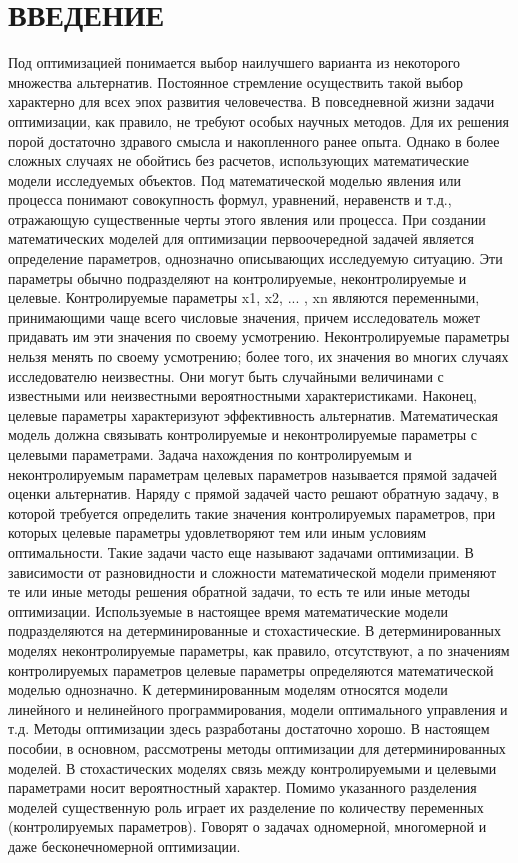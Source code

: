 \newpage

\section*{ВВЕДЕНИЕ}
Под оптимизацией понимается выбор наилучшего варианта из некоторого множества альтернатив. Постоянное стремление осуществить такой выбор характерно для всех эпох развития человечества. В повседневной жизни задачи оптимизации, как правило, не требуют особых научных методов. Для их решения порой достаточно здравого смысла и накопленного ранее опыта. Однако в более сложных случаях не обойтись без расчетов, использующих математические модели исследуемых объектов. Под математической моделью явления или процесса понимают совокупность формул, уравнений, неравенств и т.д., отражающую существенные черты этого явления или процесса. При создании математических моделей для оптимизации первоочередной задачей является определение параметров, однозначно описывающих исследуемую ситуацию. Эти параметры обычно подразделяют на контролируемые, неконтролируемые и целевые.
Контролируемые параметры x1, x2, ... , xn являются переменными, принимающими чаще всего числовые значения, причем исследователь может придавать им эти значения по своему усмотрению. Неконтролируемые параметры нельзя менять по своему усмотрению; более того, их значения во многих случаях исследователю неизвестны. Они могут быть случайными величинами с известными или неизвестными вероятностными характеристиками. Наконец, целевые параметры характеризуют эффективность альтернатив.
Математическая модель должна связывать контролируемые и неконтролируемые параметры с целевыми параметрами. Задача нахождения по контролируемым и  неконтролируемым параметрам целевых параметров называется прямой задачей оценки альтернатив.
Наряду с прямой задачей часто решают обратную задачу, в которой требуется определить такие значения контролируемых параметров, при которых целевые параметры  удовлетворяют тем или иным условиям оптимальности. Такие задачи часто  еще называют задачами оптимизации. В зависимости от разновидности и сложности математической модели применяют те или иные методы решения обратной задачи, то есть те или иные методы оптимизации. Используемые в настоящее время математические модели подразделяются на детерминированные и стохастические. В детерминированных моделях неконтролируемые параметры, как правило, отсутствуют, а по значениям контролируемых параметров целевые параметры определяются математической моделью однозначно. К детерминированным моделям относятся модели линейного и нелинейного программирования, модели оптимального управления и т.д. Методы оптимизации здесь разработаны достаточно хорошо. В настоящем пособии, в основном, рассмотрены методы оптимизации для детерминированных моделей. В стохастических моделях связь между контролируемыми и целевыми параметрами носит вероятностный характер. Помимо указанного разделения моделей существенную роль играет их разделение по количеству переменных (контролируемых параметров). Говорят о задачах одномерной, многомерной и даже бесконечномерной оптимизации.
